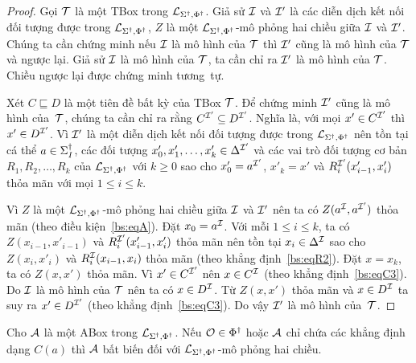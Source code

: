 \begin{proof}
	Gọi $\mathcal{T}$ là một TBox trong $\mathcal{L}_{\Sigma^\dag,\Phi^\dag}$. Giả sử $\mathcal{I}$ và $\mathcal{I}'$ là các diễn dịch kết nối đối tượng được trong $\mathcal{L}_{\Sigma^\dag,\Phi^\dag}$, $Z$ là một $\mathcal{L}_{\Sigma^\dag,\Phi^\dag}$-mô phỏng hai chiều giữa $\mathcal{I}$ và $\mathcal{I}'$. Chúng ta cần chứng minh nếu $\mathcal{I}$ là mô hình của $\mathcal{T}$ thì $\mathcal{I}'$ cũng là mô hình của $\mathcal{T}$ và ngược lại. Giả sử $\mathcal{I}$ là mô hình của $\mathcal{T}$, ta cần chỉ ra $\mathcal{I}'$ là mô hình của $\mathcal{T}$. Chiều ngược lại được chứng minh tương~tự.
	
	Xét $C \sqsubseteq D$ là một tiên đề bất kỳ của TBox $\mathcal{T}$. Để chứng minh $\mathcal{I}'$ cũng là mô hình của~$\mathcal{T}$, chúng ta cần chỉ ra rằng $C^{\mathcal{I}'} \subseteq D^{\mathcal{I}'}$. Nghĩa là, với mọi $x' \in C^{\mathcal{I}'}$ thì $x' \in D^{\mathcal{I}'}$. Vì $\mathcal{I}'$ là một diễn dịch kết nối đối tượng được trong $\mathcal{L}_{\Sigma^\dag,\Phi^\dag}$ nên tồn tại cá thể $a \in \Sigma^\dag_I$, các đối tượng $x'_0, x'_1, \ldots, x'_k \in \Delta^{\mathcal{I}'}$ và các vai trò đối tượng cơ bản $R_1, R_2, \ldots, R_k$ của $\mathcal{L}_{\Sigma^\dag,\Phi^\dag}$ với $k \geq 0$ sao cho $x'_0 = a^{\mathcal{I}'}$, $x'_k = x'$ và $R_i^{\mathcal{I}'}(x'_{i-1}, x'_i)$ thỏa mãn với mọi $1 \leq i \leq k$.
	
	Vì $Z$ là một $\mathcal{L}_{\Sigma^\dag,\Phi^\dag}$-mô phỏng hai chiều giữa $\mathcal{I}$ và $\mathcal{I}'$ nên ta có $Z(a^{\mathcal{I}}, a^{\mathcal{I}'})$ thỏa mãn (theo điều kiện~\eqref{bs:eqA}). Đặt $x_0 = a^{\mathcal{I}}$. Với mỗi $1 \leq i \leq k$, ta có $Z(x_{i-1},x'_{i-1})$ và $R_i^{\mathcal{I}'}(x'_{i-1},x'_i)$ thỏa mãn nên tồn tại $x_i \in \Delta^{\mathcal{I}}$ sao cho $Z(x_i, x'_i)$ và $R_i^{\mathcal{I}}(x_{i-1}, x_i)$ thỏa mãn (theo khẳng định~\eqref{bs:eqR2}). Đặt $x=x_k$, ta có $Z(x,x')$ thỏa mãn. Vì $x' \in C^{\mathcal{I}'}$ nên $x \in C^{\mathcal{I}}$ (theo khẳng định~\eqref{bs:eqC3}). Do $\mathcal{I}$ là mô hình của $\mathcal{T}$ nên ta có $x \in D^{\mathcal{I}}$. Từ $Z(x, x')$ thỏa mãn và $x \in D^{\mathcal{I}}$ ta suy ra $x' \in D^{\mathcal{I}'}$ (theo khẳng định~\eqref{bs:eqC3}). Do vậy $\mathcal{I}'$ là mô hình của~$\mathcal{T}$.
\end{proof}

\begin{Theorem}
\label{th:ABoxInvariant}
	Cho $\mathcal{A}$ là một ABox trong $\mathcal{L}_{\Sigma^\dag,\Phi^\dag}$. Nếu $\mathcal{O} \in \Phi^\dag$ hoặc $\mathcal{A}$ chỉ chứa các khẳng định dạng $C(a)$ thì $\mathcal{A}$ bất biến đối với $\mathcal{L}_{\Sigma^\dag,\Phi^\dag}$-mô phỏng hai chiều.\myend
\end{Theorem}


